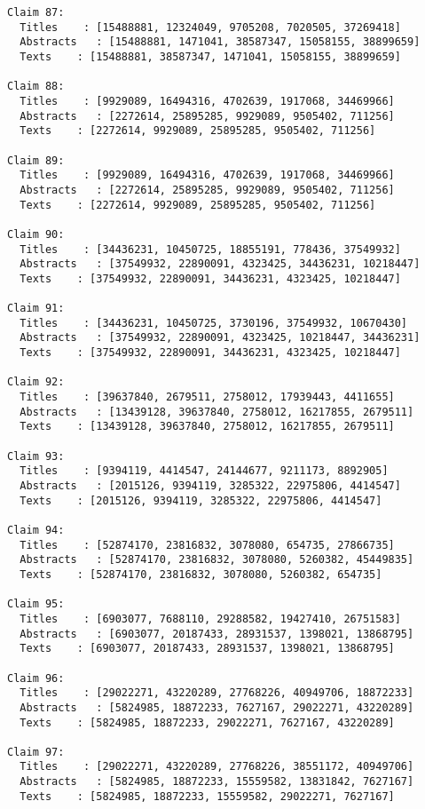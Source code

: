 \documentclass[11pt]{article}
\begin{document}
\begin{Verbatim}[commandchars=\\\{\}]
Claim 87:
  Titles    : [15488881, 12324049, 9705208, 7020505, 37269418]
  Abstracts   : [15488881, 1471041, 38587347, 15058155, 38899659]
  Texts    : [15488881, 38587347, 1471041, 15058155, 38899659]

Claim 88:
  Titles    : [9929089, 16494316, 4702639, 1917068, 34469966]
  Abstracts   : [2272614, 25895285, 9929089, 9505402, 711256]
  Texts    : [2272614, 9929089, 25895285, 9505402, 711256]

Claim 89:
  Titles    : [9929089, 16494316, 4702639, 1917068, 34469966]
  Abstracts   : [2272614, 25895285, 9929089, 9505402, 711256]
  Texts    : [2272614, 9929089, 25895285, 9505402, 711256]

Claim 90:
  Titles    : [34436231, 10450725, 18855191, 778436, 37549932]
  Abstracts   : [37549932, 22890091, 4323425, 34436231, 10218447]
  Texts    : [37549932, 22890091, 34436231, 4323425, 10218447]

Claim 91:
  Titles    : [34436231, 10450725, 3730196, 37549932, 10670430]
  Abstracts   : [37549932, 22890091, 4323425, 10218447, 34436231]
  Texts    : [37549932, 22890091, 34436231, 4323425, 10218447]

Claim 92:
  Titles    : [39637840, 2679511, 2758012, 17939443, 4411655]
  Abstracts   : [13439128, 39637840, 2758012, 16217855, 2679511]
  Texts    : [13439128, 39637840, 2758012, 16217855, 2679511]

Claim 93:
  Titles    : [9394119, 4414547, 24144677, 9211173, 8892905]
  Abstracts   : [2015126, 9394119, 3285322, 22975806, 4414547]
  Texts    : [2015126, 9394119, 3285322, 22975806, 4414547]

Claim 94:
  Titles    : [52874170, 23816832, 3078080, 654735, 27866735]
  Abstracts   : [52874170, 23816832, 3078080, 5260382, 45449835]
  Texts    : [52874170, 23816832, 3078080, 5260382, 654735]

Claim 95:
  Titles    : [6903077, 7688110, 29288582, 19427410, 26751583]
  Abstracts   : [6903077, 20187433, 28931537, 1398021, 13868795]
  Texts    : [6903077, 20187433, 28931537, 1398021, 13868795]

Claim 96:
  Titles    : [29022271, 43220289, 27768226, 40949706, 18872233]
  Abstracts   : [5824985, 18872233, 7627167, 29022271, 43220289]
  Texts    : [5824985, 18872233, 29022271, 7627167, 43220289]

Claim 97:
  Titles    : [29022271, 43220289, 27768226, 38551172, 40949706]
  Abstracts   : [5824985, 18872233, 15559582, 13831842, 7627167]
  Texts    : [5824985, 18872233, 15559582, 29022271, 7627167]


\end{Verbatim}
\end{document}
